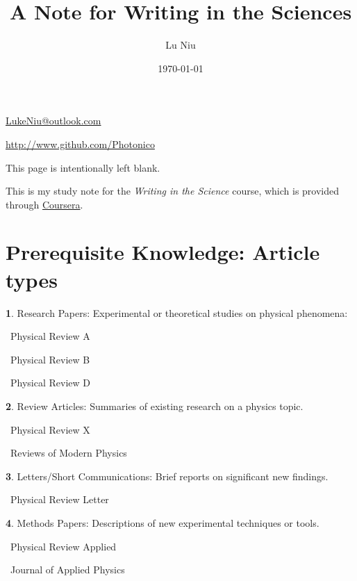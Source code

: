 \documentclass[a4paper, 12pt]{article}
\title{\textbf{A Note for Writing in the Sciences}}
\author{Lu Niu}
\date{\today}
\begin{document}
\maketitle
\vspace{\fill}
\begin{center}
    \par\href{mailto:LukeNiu@outlook.com}{LukeNiu@outlook.com}
    \par\href{http://www.github.com/Photonico}{http://www.github.com/Photonico}
\end{center}
\thispagestyle{empty}

\newpage
This page is intentionally left blank.
\thispagestyle{empty}

\newpage
\thispagestyle{empty}
\tableofcontents
\thispagestyle{empty}

\newpage
{}

This is my study note for the \textit{Writing in the Science} course,
which is provided through \href{https://www.coursera.org/learn/sciwrite}{Coursera}.

\section*{Prerequisite Knowledge: Article types}

\textbf{1}. Research Papers: Experimental or theoretical studies on physical phenomena:
\par\quad\textopenbullet\ Physical Review A
\par\quad\textopenbullet\ Physical Review B
\par\quad\textopenbullet\ Physical Review D

\textbf{2}. Review Articles: Summaries of existing research on a physics topic.
\par\quad\textopenbullet\ Physical Review X
\par\quad\textopenbullet\ Reviews of Modern Physics

\textbf{3}. Letters/Short Communications: Brief reports on significant new findings.
\par\quad\textopenbullet\ Physical Review Letter

\textbf{4}. Methods Papers: Descriptions of new experimental techniques or tools.
\par\quad\textopenbullet\ Physical Review Applied
\par\quad\textopenbullet\ Journal of Applied Physics
\end{document}
